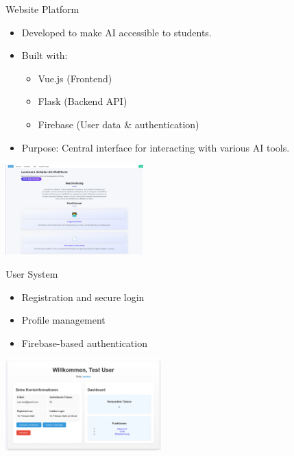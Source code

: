 \documentclass{beamer}
\begin{document}
\begin{frame}{Website Platform}
  \begin{itemize}
    \item Developed to make AI accessible to students.
    \item Built with:
    \begin{itemize}
      \item Vue.js (Frontend)
      \item Flask (Backend API)
      \item Firebase (User data \& authentication)
    \end{itemize}
    \item Purpose: Central interface for interacting with various AI tools.
  \end{itemize}
  \vspace{0.5cm}
  \centering
  \includegraphics[height=3.5cm]{homepage-screenshot.png} %
\end{frame}



\begin{frame}{User System}
  \begin{itemize}
    \item Registration and secure login
    \item Profile management
    \item Firebase-based authentication
  \end{itemize}
  \vspace{0.5cm}
  \centering
  \includegraphics[height=3.5cm]{Account-Managment.png} %
\end{frame}
\end{document}
